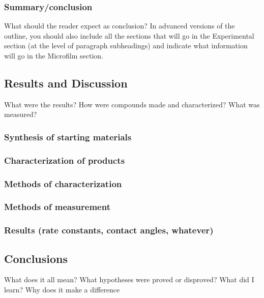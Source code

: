 \documentclass[11pt]{article}
\begin{document}
\subsubsection{Summary/conclusion}
\label{sec:org37d7699}
What should the reader expect as conclusion? In advanced versions of the
outline, you should also include all the sections that will go in the
Experimental section (at the level of paragraph subheadings) and indicate what
information will go in the Microfilm section.
\vspace*{120px}

\subsection{Results and Discussion}
\label{sec:orgad33888}
What were the results? How were compounds made and characterized? What was
measured?
\vspace*{120px}

\subsubsection{Synthesis of starting materials}
\label{sec:org390ea94}
\vspace*{120px}

\subsubsection{Characterization of products}
\label{sec:orgb09af94}
\vspace*{120px}

\subsubsection{Methods of characterization}
\label{sec:org5b6eff6}
\vspace*{120px}

\subsubsection{Methods of measurement}
\label{sec:org587ac4d}
\vspace*{120px}

\subsubsection{Results (rate constants, contact angles, whatever)}
\label{sec:orge6cead3}
\vspace*{120px}

\subsection{Conclusions}
\label{sec:org0e1fb57}
What does it all mean? What hypotheses were proved or disproved? What did I
learn? Why does it make a difference
\vspace*{120px}
\end{document}
